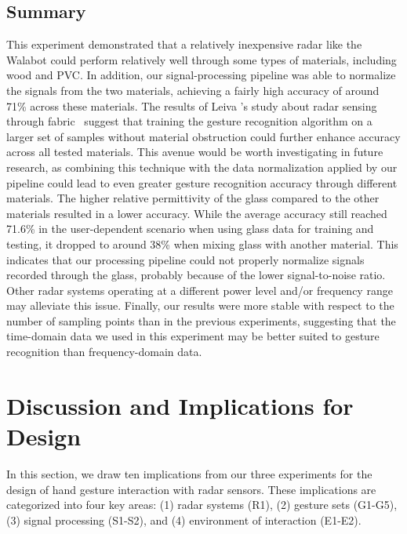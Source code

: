 \subsection{Summary} \label{sec:radar-experiments:through-materials:discussion}
This experiment demonstrated that a relatively inexpensive radar like the Walabot could perform relatively well through some types of materials, including wood and PVC. In addition, our signal-processing pipeline was able to normalize the signals from the two materials, achieving a fairly high accuracy of around 71\% across these materials.
The results of Leiva \etal's study about radar sensing through fabric~\cite{Leiva:2020} suggest that training the gesture recognition algorithm on a larger set of samples without material obstruction could further enhance accuracy across all tested materials. This avenue would be worth investigating in future research, as combining this technique with the data normalization applied by our pipeline could lead to even greater gesture recognition accuracy through different materials.
%
The higher relative permittivity of the glass compared to the other materials resulted in a lower accuracy. While the average accuracy still reached 71.6\% in the user-dependent scenario when using glass data for training and testing, it dropped to around 38\% when mixing glass with another material. This indicates that our processing pipeline could not properly normalize signals recorded through the glass, probably because of the lower signal-to-noise ratio. Other radar systems operating at a different power level and/or frequency range may alleviate this issue.
%
Finally, our results were more stable with respect to the number of sampling points than in the previous experiments, suggesting that the time-domain data we used in this experiment may be better suited to gesture recognition than frequency-domain data.

\section{Discussion and Implications for Design} \label{sec:radar-experiments:discussion}
In this section, we draw ten implications from our three experiments for the design of hand gesture interaction with radar sensors. These implications are categorized into four key areas: (1) radar systems (R1), (2) gesture sets (G1-G5), (3) signal processing (S1-S2), and (4) environment of interaction (E1-E2).

